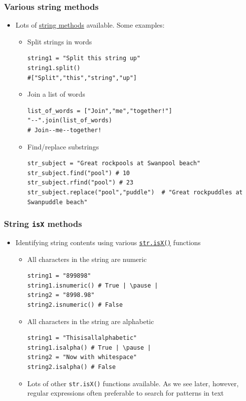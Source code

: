 \documentclass[xcolor=table]{beamer}
\begin{document}
\begin{frame}[fragile]
    \frametitle{Various string methods}
    \begin{itemize} 
        \item Lots of \href{https://docs.python.org/3/library/stdtypes.html#string-methods}{string methods} available. Some examples: \pause
    \begin{itemize}\addtolength{\itemsep}{-1\baselineskip}
    \item Split strings in words
\begin{lstlisting}[style=python]
string1 = "Split this string up"
string1.split()
#["Split","this","string","up"]
\end{lstlisting} \pause
    \item Join a list of words
\begin{lstlisting}[style=python]
list_of_words = ["Join","me","together!"]
"--".join(list_of_words)
# Join--me--together!
\end{lstlisting} \pause
    \item Find/replace substrings
\begin{lstlisting}[style=python]
str_subject = "Great rockpools at Swanpool beach"
str_subject.find("pool") # 10
str_subject.rfind("pool") # 23
str_subject.replace("pool","puddle")  # "Great rockpuddles at Swanpuddle beach"
\end{lstlisting} \pause
    \end{itemize} 
\end{itemize} 
\end{frame} 

\begin{frame}[fragile]
    \frametitle{String \texttt{isX} methods}
    \begin{itemize} 
        \item Identifying string contents using various \href{https://docs.python.org/3/library/stdtypes.html#string-methods}{\texttt{str.isX()}} functions \pause
    \begin{itemize}\addtolength{\itemsep}{-1\baselineskip}
    \item All characters in the string are numeric
\begin{lstlisting}[style=python]
string1 = "899898"
string1.isnumeric() # True | \pause |
string2 = "8998.98"
string2.isnumeric() # False
\end{lstlisting} \pause
    \item All characters in the string are alphabetic
\begin{lstlisting}[style=python]
string1 = "Thisisallalphabetic"
string1.isalpha() # True | \pause |
string2 = "Now with whitespace"
string2.isalpha() # False
\end{lstlisting} \pause
    \item Lots of other \texttt{str.isX()} functions available. As we see later, however, regular expressions often preferable to search for patterns in text
    \end{itemize}
\end{itemize}
\end{frame}
\end{document}
